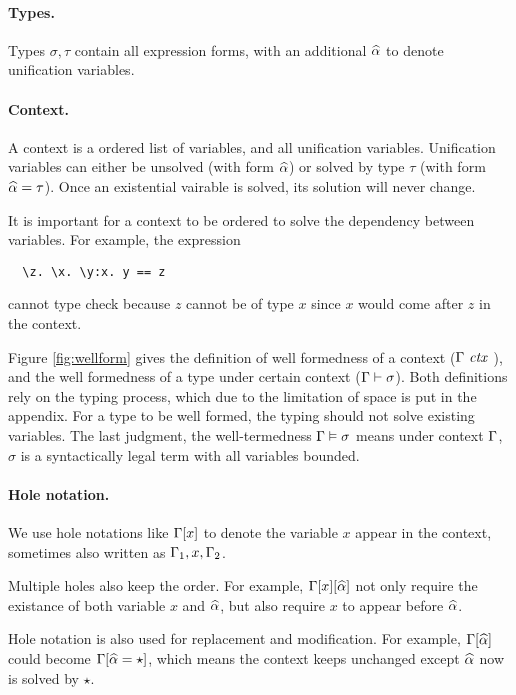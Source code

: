 \paragraph{Types.} Types $\sigma, \tau$ contain all expression forms, with an
additional $\widehat{\alpha}$ to denote unification variables.

\paragraph{Context.} A context is a ordered list of variables, and all
unification variables.
Unification variables can either be unsolved
(with form $\widehat{\alpha}$) or solved by type $\tau$ (with form $\widehat{\alpha} = \tau$).
Once an existential vairable is solved, its solution will never change.

It is important for a context to be ordered to solve the dependency between
variables.
For example, the expression

\begin{lstlisting}
  \z. \x. \y:x. y == z
\end{lstlisting}

\noindent cannot type check because $z$ cannot be of type $x$ since $x$
would come after $z$ in the context.

Figure \ref{fig:wellform} gives the definition of well formedness of a context
($\Gamma \ \mathit{ctx}\ $),
and the well formedness of
a type under certain context ($\Gamma \vdash \sigma$).
Both definitions rely on the typing process,
which due to the limitation of space is put in the appendix.
For a type to be well formed, the typing should not solve existing variables.
The last judgment, the
well-termedness
$\Gamma \vDash \sigma$ means under context $\Gamma$, $\sigma$ is a syntactically
legal term with all variables bounded.

\paragraph{Hole notation.} We use hole notations like $\Gamma[x]$ to
denote the variable $x$ appear in the context, sometimes also written as
$\Gamma_1, x, \Gamma_2$.

Multiple holes also keep the order. For example, $\Gamma[x][\widehat{\alpha}]$ not only
require the existance of both variable $x$ and $\widehat{\alpha}$, but also require $x$ to
appear before $\widehat{\alpha}$.

Hole notation is also used for replacement and modification. For example,
$\Gamma[\widehat{\alpha}]$ could become
$\Gamma[\widehat{\alpha} = \star]$, which means the context keeps unchanged except $\widehat{\alpha}$
now is solved by $\star$.


